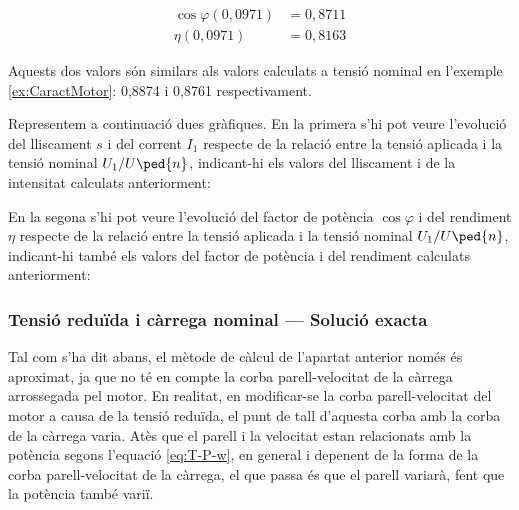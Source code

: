 \begin{exemple}
	\begin{align*}
	\cos\varphi(0{,}0971) &=  0{,}8711 \\
	\eta(0{,}0971) &=  0{,}8163
	\end{align*}
	
	Aquests dos valors són similars als valors calculats a tensió nominal en  l'exemple \ref{ex:CaractMotor}: 0,8874 i 0,8761 respectivament.
	
	Representem a continuació dues gràfiques. En la primera s'hi pot veure  l'evolució del lliscament $s$ i del corrent $I_1$ respecte de la relació entre la tensió aplicada i la tensió nominal $U_1/U\ped{n}$, indicant-hi els valors del lliscament i de la intensitat calculats anteriorment:
	\begin{center}
		
	\end{center}

	En la segona s'hi pot veure l'evolució del factor de potència $\cos\varphi$ i del rendiment $\eta$ respecte de la relació entre la tensió aplicada i la tensió nominal $U_1/U\ped{n}$, indicant-hi també  els valors del factor de potència i del rendiment calculats anteriorment:
	\begin{center}
		
	\end{center}	
\end{exemple}

\subsubsection{Tensió reduïda i càrrega nominal --- Solució exacta}

Tal com s'ha dit abans, el mètode de càlcul de l'apartat anterior només és aproximat, ja que no té en compte la corba parell-velocitat de la càrrega arrossegada pel motor. En realitat, en modificar-se la corba parell-velocitat del motor a causa de la tensió reduïda, el punt de tall d'aquesta corba amb la corba de la càrrega varia. Atès que el parell i la velocitat estan relacionats amb la potència segons l'equació  \eqref{eq:T-P-w}, en general i depenent de la forma de la corba parell-velocitat de la càrrega, el que passa és que el parell variarà, fent que la potència també variï.

